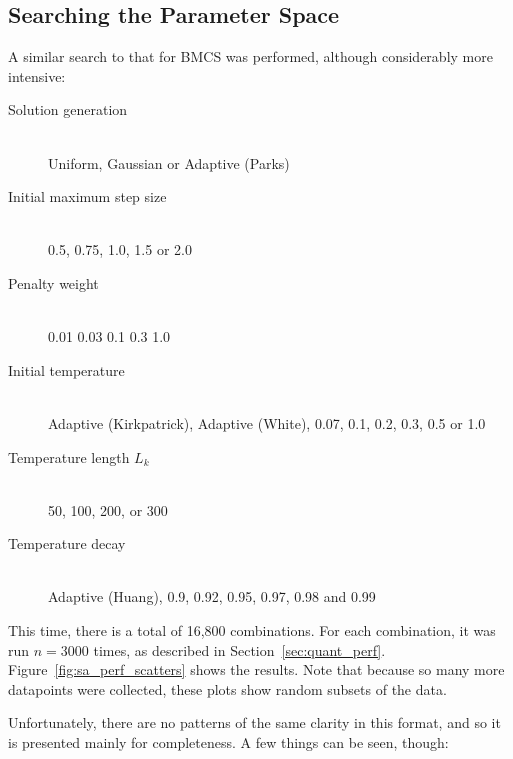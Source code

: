 \documentclass[10pt]{article}
\begin{document}
\subsection{Searching the Parameter Space}

A similar search to that for BMCS was performed, although considerably more
intensive:

\begin{description}
  \item[Solution generation] \hfill \\
    Uniform, Gaussian or Adaptive (Parks)
  \item[Initial maximum step size] \hfill \\
    0.5, 0.75, 1.0, 1.5 or 2.0
  \item[Penalty weight] \hfill \\
    0.01 0.03 0.1 0.3 1.0
  \item[Initial temperature] \hfill \\
    Adaptive (Kirkpatrick), Adaptive (White), 0.07,
    0.1, 0.2, 0.3, 0.5 or 1.0
  \item[Temperature length $L_k$] \hfill \\
    50, 100, 200, or 300
  \item[Temperature decay] \hfill \\
    Adaptive (Huang), 0.9, 0.92, 0.95, 0.97, 0.98 and
    0.99
    \end{description}

This time, there is a total of 16,800 combinations. For each combination, it
was run $n = 3000$ times, as described in Section~\ref{sec:quant_perf}.
Figure~\ref{fig:sa_perf_scatters} shows the results. Note that because so many
more datapoints were collected, these plots show random subsets of the data.

Unfortunately, there are no patterns of the same clarity in this format, and
so it is presented mainly for completeness. A few things can be seen, though:
\end{document}
